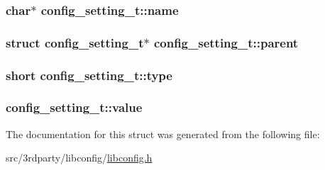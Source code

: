 \hypertarget{structconfig__setting__t_a2228af4451498a4961b72dd4dcfe57cb}{
\subsubsection[{name}]{\setlength{\rightskip}{0pt plus 5cm}char$\ast$ config\-\_\-setting\-\_\-t\-::name}}\label{structconfig__setting__t_a2228af4451498a4961b72dd4dcfe57cb}
\hypertarget{structconfig__setting__t_a70368ebbbb3c902adbbcd96606547d7d}{
\subsubsection[{parent}]{\setlength{\rightskip}{0pt plus 5cm}struct {\bf config\-\_\-setting\-\_\-t}$\ast$ config\-\_\-setting\-\_\-t\-::parent}}\label{structconfig__setting__t_a70368ebbbb3c902adbbcd96606547d7d}
\hypertarget{structconfig__setting__t_aab8065083de2436448b7b99b46feff18}{
\subsubsection[{type}]{\setlength{\rightskip}{0pt plus 5cm}short config\-\_\-setting\-\_\-t\-::type}}\label{structconfig__setting__t_aab8065083de2436448b7b99b46feff18}
\hypertarget{structconfig__setting__t_a2d217386c7e30456e484151b61ce597f}{
\subsubsection[{value}]{ config\-\_\-setting\-\_\-t\-::value}}\label{structconfig__setting__t_a2d217386c7e30456e484151b61ce597f}


The documentation for this struct was generated from the following file\-:\begin{DoxyCompactItemize}
\item 
src/3rdparty/libconfig/\hyperlink{libconfig_8h}{libconfig.\-h}\end{DoxyCompactItemize}
